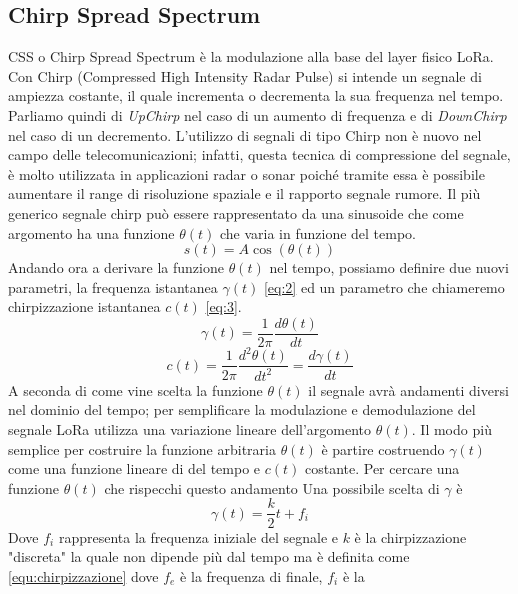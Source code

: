 \subsection{Chirp Spread Spectrum}
CSS o Chirp Spread Spectrum è la modulazione alla base del layer fisico LoRa. 
Con Chirp (Compressed High Intensity Radar Pulse) si intende un segnale di
ampiezza costante, il quale incrementa o decrementa la sua frequenza nel tempo.
Parliamo quindi di \emph{UpChirp} nel caso di un aumento di frequenza e di
\emph{DownChirp} nel caso di un decremento.
L'utilizzo di segnali di tipo Chirp non è nuovo nel campo delle
telecomunicazioni; infatti, questa tecnica di compressione del segnale, 
è molto utilizzata in applicazioni radar o  sonar  poiché tramite essa è possibile aumentare il range
di risoluzione spaziale e il rapporto segnale rumore.
Il più generico segnale chirp può essere rappresentato da una sinusoide che come
argomento ha una funzione $\theta(t)$ che varia in funzione del tempo.
\begin{equation}\label{eq:1}
        s(t) = A\cos(\theta (t))
\end{equation}
Andando ora a derivare la funzione  $\theta(t)$ nel tempo, possiamo  definire due
nuovi parametri, la frequenza istantanea $\gamma(t)$ \ref{eq:2} ed un parametro che
chiameremo chirpizzazione istantanea $c(t)$ \ref{eq:3}.
\begin{equation}\label{eq:2}
        \gamma(t) = \frac{1}{2\pi} \frac{d\theta(t)}{dt}
\end{equation}
\begin{equation}\label{eq:3}
        c(t) = \frac{1}{2\pi} \frac{d^2\theta(t)}{dt^2} = \frac{d\gamma(t)}{dt}
\end{equation}
A seconda di come vine scelta la funzione $\theta(t)$ il segnale avrà
andamenti diversi nel dominio del tempo; per semplificare la modulazione e
demodulazione del segnale LoRa utilizza una variazione lineare dell'argomento
$\theta(t)$.
Il modo più semplice per costruire la funzione arbitraria $\theta(t)$ è partire
costruendo $\gamma(t)$ come una funzione lineare di del tempo e $c(t)$ costante.
Per cercare una funzione $\theta(t)$ che rispecchi questo andamento 
Una possibile scelta di $\gamma$ è 
\begin{equation}
        \gamma(t) = \frac{k}{2}t+f_i
\end{equation}
Dove $f_i$ rappresenta la frequenza iniziale del segnale e $k$ è la 
chirpizzazione "discreta" la quale non dipende più dal tempo ma è definita come
\ref{equ:chirpizzazione} dove $f_e$ è la frequenza di finale, $f_i$ è la
